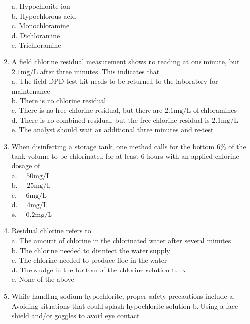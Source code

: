 \documentclass{article}
\begin{document}
\begin{enumerate}
a. Hypochlorite ion\\
b. Hypochlorous acid\\
c. Monochloramine\\
d. Dichloramine\\
e. Trichloramine\\
  \item A field chlorine residual measurement shows no reading at one minute, but $2.1 \mathrm{mg} / \mathrm{L}$ after three minutes. This indicates that\\
a. The field DPD test kit needs to be returned to the laboratory for maintenance\\
b. There is no chlorine residual\\
c. There is no free chlorine residual, but there are $2.1 \mathrm{mg} / \mathrm{L}$ of chloramines\\
d. There is no combined residual, but the free chlorine residual is $2.1 \mathrm{mg} / \mathrm{L}$\\
e. The analyst should wait an additional three minutes and re-test\\
  \item When disinfecting a storage tank, one method calls for the bottom $6 \%$ of the tank volume to be chlorinated for at least 6 hours with an applied chlorine dosage of\\
a. $\quad 50 \mathrm{mg} / \mathrm{L}$\\
b. $\quad 25 \mathrm{mg} / \mathrm{L}$\\
c. $\quad 6 \mathrm{mg} / \mathrm{L}$\\
d. $\quad 4 \mathrm{mg} / \mathrm{L}$\\
e. $\quad 0.2 \mathrm{mg} / \mathrm{L}$ \\
\item Residual chlorine refers to\\
a. The amount of chlorine in the chlorinated water after several minutes\\
b. The chlorine needed to disinfect the water supply\\
c. The chlorine needed to produce floc in the water\\
d. The sludge in the bottom of the chlorine solution tank\\
e. None of the above\\
 \item While handling sodium hypochlorite, proper safety precautions include
a. Avoiding situations that could splash hypochlorite solution
b. Using a face shield and/or goggles to avoid eye contact

\end{enumerate}
\end{document}
